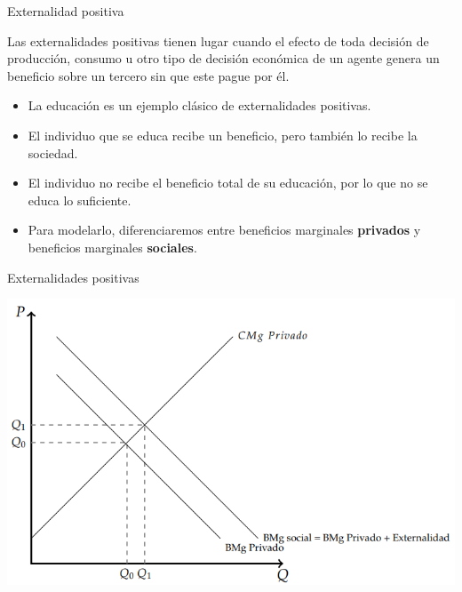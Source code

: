 \documentclass{beamer}
\begin{document}
\begin{frame}{Externalidad positiva}
    \begin{boxA}
        Las externalidades positivas tienen lugar cuando el efecto de
        toda decisión de producción, consumo u otro tipo de decisión
        económica de un agente genera un beneficio sobre un tercero sin
        que este pague por él.
    \end{boxA}
    \begin{itemize}
        \item La educación es un ejemplo clásico de externalidades positivas.
        \item El individuo que se educa recibe un beneficio, pero también lo recibe la sociedad.
        \item El individuo no recibe el beneficio total de su educación, por lo que no se educa lo suficiente.
        \item Para modelarlo, diferenciaremos entre beneficios marginales \textbf{privados} y beneficios marginales \textbf{sociales}.
    \end{itemize}
\end{frame}


\begin{frame}{Externalidades positivas}
    \begin{center}
        \includegraphics[scale=0.7]{../Figures/C25.1.png}
    \end{center}
\end{frame}
\end{document}
